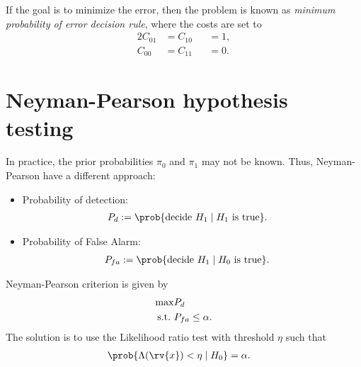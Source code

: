 If the goal is to minimize the error, then the problem is known as \emph{minimum probability of error decision rule}, where the costs are set to
\begin{alignat}{2}
    C_{01} &= C_{10} &&= 1,\\
    C_{00} &= C_{11} &&= 0.
\end{alignat}

\section{Neyman-Pearson hypothesis testing}
In practice, the prior probabilities $\pi_{0}$ and $\pi_{1}$ may not be known. Thus, Neyman-Pearson have a different approach:
\begin{itemize}
    \item Probability of detection: 
    \begin{align}
        \symProb_{d} &:= \prob{\text{decide } H_{1} \mid H_{1} \text{ is true}}.
    \end{align}
    \item Probability of False Alarm: 
    \begin{align}
        \symProb_{fa} &:= \prob{\text{decide } H_{1} \mid H_{0} \text{ is true}}.
    \end{align}
\end{itemize}
Neyman-Pearson criterion is given by
\begin{align}
    \max &P_{d}\\
    \mathrm{s.t.}~ &P_{fa}\leq\alpha.
\end{align}
The solution is to use the Likelihood ratio test with threshold $\eta$ such that
\begin{align}
    \prob{\Lambda(\rv{x}) < \eta \mid H_{0}} &= \alpha.
\end{align}

